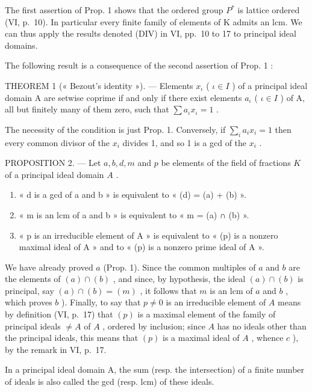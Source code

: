 The first assertion of Prop. 1 shows that the ordered group \(P^{*}\) is lattice ordered (VI, p.~10). In particular every finite family of elements of K admits an lcm. We can thus apply the results denoted (DIV) in VI, pp.~10 to 17 to principal ideal domains.

The following result is a consequence of the second assertion of Prop. 1 :

THEOREM 1 (« Bezout's identity »). --- Elements \(x_{\iota}\) ( \(\iota \in I\) ) of a principal ideal domain A are setwise coprime if and only if there exist elements \(a_{\iota}\) ( \(\iota \in I\) ) of A, all but finitely many of them zero, such that \(\sum a_{\iota}x_{\iota} = 1\) .

The necessity of the condition is just Prop. 1. Conversely, if \(\sum_{i} a_i x_i = 1\) then every common divisor of the \(x_i\) divides 1, and so 1 is a gcd of the \(x_i\) .

PROPOSITION 2. --- Let \(a, b, d, m\) and \(p\) be elements of the field of fractions \(K\) of a principal ideal domain \(A\) .

\begin{enumerate}
\def\labelenumi{\alph{enumi})}
\item
  « d is a gcd of a and b » is equivalent to « (d) = (a) + (b) ».
\item
  « m is an lcm of a and b » is equivalent to « m = (a) ∩ (b) ».
\item
  « p is an irreducible element of A » is equivalent to « (p) is a nonzero maximal ideal of A » and to « (p) is a nonzero prime ideal of A ».
\end{enumerate}

We have already proved \(a\) (Prop. 1). Since the common multiples of \(a\) and \(b\) are the elements of \((a) \cap (b)\) , and since, by hypothesis, the ideal \((a) \cap (b)\) is principal, say \((a) \cap (b) = (m)\) , it follows that \(m\) is an lcm of \(a\) and \(b\) , which proves \(b\) ). Finally, to say that \(p \neq 0\) is an irreducible element of \(A\) means by definition (VI, p.~17) that \((p)\) is a maximal element of the family of principal ideals \(\neq A\) of \(A\) , ordered by inclusion; since \(A\) has no ideals other than the principal ideals, this means that \((p)\) is a maximal ideal of \(A\) , whence \(c\) ), by the remark in VI, p.~17.

In a principal ideal domain A, the sum (resp. the intersection) of a finite number of ideals is also called the gcd (resp. lcm) of these ideals.

